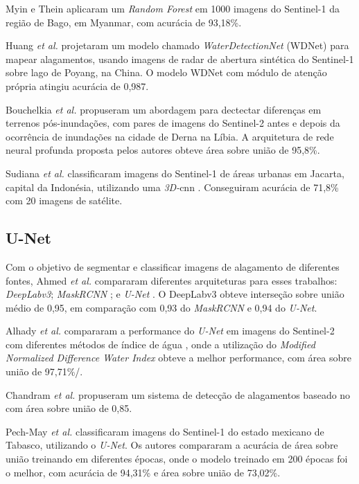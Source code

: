 Myin e Thein \cite{myin2024} aplicaram um \textit{Random Forest} em 1000 imagens do Sentinel-1 da região de Bago, em Myanmar, com acurácia de 93,18\%. 

Huang \textit{et al.} \cite{huang2024} projetaram um modelo chamado \textit{WaterDetectionNet} (WDNet) para mapear alagamentos, 
usando imagens de radar de abertura sintética \cite{sar} do Sentinel-1 sobre lago de Poyang, na China. O modelo WDNet com módulo de atenção própria atingiu acurácia de 0,987.

Bouchelkia \textit{et al.} \cite{bouchelkia2024} propuseram um abordagem para dectectar diferenças em terrenos pós-inundações, 
com pares de imagens do Sentinel-2 antes e depois da ocorrência de inundações na cidade de Derna na Líbia. 
A arquitetura de rede neural profunda \cite{dnn} proposta pelos autores obteve área sobre união de 95,8\%.

Sudiana \textit{et al.} \cite{sudiana2025} classificaram imagens do Sentinel-1 de áreas urbanas em Jacarta, capital da Indonésia, utilizando uma \textit{3D-}\acrshort{cnn} \cite{3dcnn}.
Conseguiram acurácia de 71,8\% com 20 imagens de satélite.

\subsection{U-Net}
Com o objetivo de segmentar e classificar imagens de alagamento de diferentes fontes, Ahmed \textit{et al.} \cite{ahmed2024} compararam diferentes arquiteturas para esses trabalhos: 
\textit{DeepLabv3}\cite{chen2017deeplabsemanticimagesegmentation}; \textit{MaskRCNN} \cite{maskrcnn}; e \textit{U-Net} \cite{unet}.
O DeepLabv3 obteve interseção sobre união \cite{iou2019} médio de 0,95, em comparação com 0,93 do \textit{MaskRCNN} e 0,94 do \textit{U-Net}.

Alhady \textit{et al.} \cite{alhady2024} compararam a performance do \textit{U-Net} em imagens do Sentinel-2 com diferentes métodos de índice de água \cite{waterindex}, onde a utilização do
\textit{Modified Normalized Difference Water Index} \cite{mndwi} obteve a melhor performance, com área sobre união de 97,71\%/.

Chandram \textit{et al.} \cite{chandran2024} propuseram um sistema de detecção de alagamentos baseado no  com área sobre união de 0,85.

Pech-May \textit{et al.} \cite{pech-may2024} classificaram imagens do Sentinel-1 do estado mexicano de Tabasco, utilizando o \textit{U-Net}. Os autores compararam a acurácia de área sobre união
treinando em diferentes épocas, onde o modelo treinado em 200 épocas foi o melhor, com acurácia de 94,31\% e área sobre união de 73,02\%.
